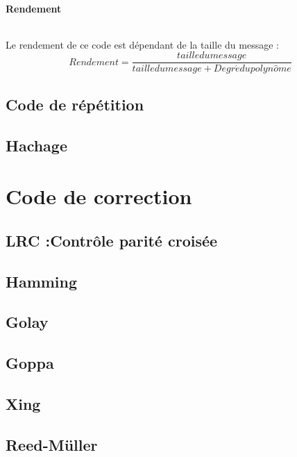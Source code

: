 \documentclass[a4paper,10pt]{report}
\begin{document}
                \subsection{Rendement}
                    \paragraph{}
                        Le rendement de ce code est dépendant de la taille du message :
                        \[  Rendement = \frac{taille du message}{taille du message + Degr\acute{e} du polyn\hat{o}me} \]


        \chapter{Code de répétition}


        \chapter{Hachage}



    \part{Code de correction}


        \chapter{LRC :Contrôle parité croisée}


        \chapter{Hamming}


        \chapter{Golay}


        \chapter{Goppa}


        \chapter{Xing}


        \chapter{Reed-Müller}
\end{document}

